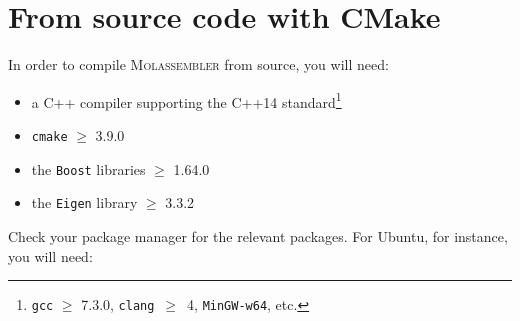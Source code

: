 \documentclass[]{tufte-book}
\begin{document}
% 
% 
% 

% 
% 


\section{From source code with CMake}
In order to compile \textsc{Molassembler} from source, you will need:
\begin{itemize}
  \item a C++ compiler supporting the C++14 standard\footnote{\texttt{gcc} $\ge$
    7.3.0, \texttt{clang}~$\ge$~4, \texttt{MinGW-w64}, etc.}
  \item \texttt{cmake} $\ge$ 3.9.0
  \item the \texttt{Boost} libraries $\ge$ 1.64.0
  \item the \texttt{Eigen} library $\ge$ 3.3.2
\end{itemize}

Check your package manager for the relevant packages. For Ubuntu, for instance,
you will need:
\end{document}
